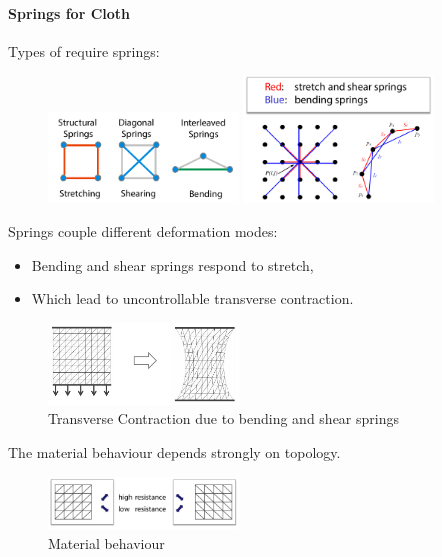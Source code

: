 \begin{multicols}{2}
\paragraph{Springs for Cloth} Types of require springs:
\begin{figure}[H]
	\centering
	\includegraphics[width=0.45\textwidth]{img/02_springs_cloth}
	\includegraphics[width=0.45\textwidth]{img/02_springs_cloth_2}
\end{figure}
Springs couple different deformation modes:
\begin{itemize}
	\item Bending and shear springs respond to stretch,
	\item Which lead to uncontrollable transverse contraction.
\end{itemize}
\begin{figure}[H]
	\centering
	\includegraphics[width=0.45\textwidth]{img/02_contraction}
	\caption{Transverse Contraction due to bending and shear springs}
\end{figure}

The material behaviour depends strongly on topology.
\begin{figure}[H]
	\centering
	\includegraphics[width=0.45\textwidth]{img/02_material_behaviour}
	\caption{Material behaviour}
\end{figure}


\end{multicols}
